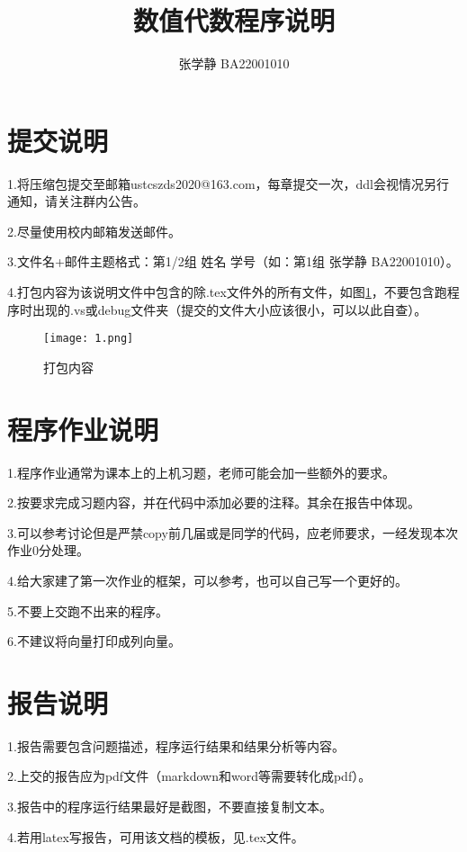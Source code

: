 \documentclass{article}
\title{数值代数程序说明}
\author{张学静 BA22001010}
\begin{document}
\maketitle

\section{提交说明}

1.将压缩包提交至邮箱ustcszds2020@163.com，每章提交一次，ddl会视情况另行通知，请关注群内公告。

2.尽量使用校内邮箱发送邮件。

3.文件名+邮件主题格式：第1/2组 姓名 学号（如：第1组 张学静 BA22001010）。

4.打包内容为该说明文件中包含的除.tex文件外的所有文件，如图\ref{filelist}，不要包含跑程序时出现的.vs或debug文件夹（提交的文件大小应该很小，可以以此自查）。
\begin{figure}[H]
\label{filelist}
\centering %
\texttt{[image: 1.png]}
\caption{打包内容} %
\end{figure}

\section{程序作业说明}

1.程序作业通常为课本上的上机习题，老师可能会加一些额外的要求。

2.按要求完成习题内容，并在代码中添加必要的注释。其余在报告中体现。

3.可以参考讨论但是严禁copy前几届或是同学的代码，应老师要求，一经发现本次作业0分处理。

4.给大家建了第一次作业的框架，可以参考，也可以自己写一个更好的。

5.不要上交跑不出来的程序。

6.不建议将向量打印成列向量。

\section{报告说明}

1.报告需要包含问题描述，程序运行结果和结果分析等内容。

2.上交的报告应为pdf文件（markdown和word等需要转化成pdf）。

3.报告中的程序运行结果最好是截图，不要直接复制文本。

4.若用latex写报告，可用该文档的模板，见.tex文件。
\end{document}
